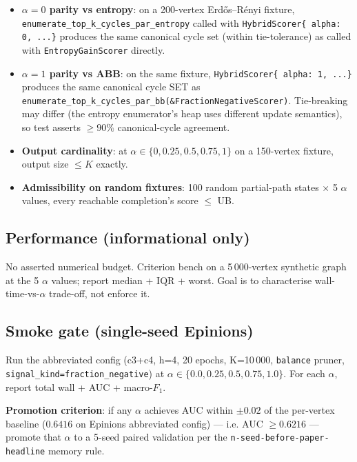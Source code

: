 \documentclass[a4paper,11pt]{article}
\begin{document}
\begin{itemize}
  \item \textbf{$\alpha = 0$ parity vs entropy}: on a 200-vertex
    Erdős--Rényi fixture,
    \texttt{enumerate\_top\_k\_cycles\_par\_entropy} called with
    \texttt{HybridScorer\{ alpha: 0, ...\}} produces the same canonical
    cycle set (within tie-tolerance) as called with
    \texttt{EntropyGainScorer} directly.
  \item \textbf{$\alpha = 1$ parity vs ABB}: on the same fixture,
    \texttt{HybridScorer\{ alpha: 1, ...\}} produces the same canonical
    cycle SET as
    \texttt{enumerate\_top\_k\_cycles\_par\_bb(\&FractionNegativeScorer)}.
    Tie-breaking may differ (the entropy enumerator's heap uses
    different update semantics), so test asserts $\ge 90\%$
    canonical-cycle agreement.
  \item \textbf{Output cardinality}: at $\alpha \in \{0, 0.25, 0.5,
    0.75, 1\}$ on a 150-vertex fixture, output size $\le K$ exactly.
  \item \textbf{Admissibility on random fixtures}: 100 random
    partial-path states $\times$ 5 $\alpha$ values, every reachable
    completion's score $\le$ UB.
\end{itemize}

\subsection*{Performance (informational only)}

No asserted numerical budget.  Criterion bench on a 5\,000-vertex
synthetic graph at the 5 $\alpha$ values; report median + IQR + worst.
Goal is to characterise wall-time-vs-$\alpha$ trade-off, not enforce
it.

\subsection*{Smoke gate (single-seed Epinions)}

Run the abbreviated config (c3+c4, h=4, 20 epochs, K=10\,000,
\texttt{balance} pruner, \texttt{signal\_kind=fraction\_negative})
at $\alpha \in \{0.0, 0.25, 0.5, 0.75, 1.0\}$.  For each $\alpha$,
report total wall + AUC + macro-$F_1$.

\textbf{Promotion criterion}: if any $\alpha$ achieves AUC within
$\pm 0.02$ of the per-vertex baseline ($0.6416$ on Epinions
abbreviated config) — i.e. AUC $\ge 0.6216$ — promote that $\alpha$
to a 5-seed paired validation per the
\texttt{n-seed-before-paper-headline} memory rule.
\end{document}
